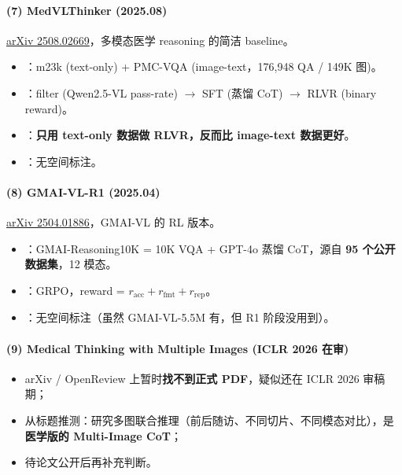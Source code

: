 \paragraph{(7) MedVLThinker (2025.08)}

\href{https://arxiv.org/abs/2508.02669}{arXiv 2508.02669}，多模态医学 reasoning 的简洁 baseline。

\begin{itemize}[leftmargin=1.5em]
  \item {}：m23k (text-only) + PMC-VQA (image-text，176,948 QA / 149K 图)。
  \item {}：filter (Qwen2.5-VL pass-rate) $\to$ SFT (蒸馏 CoT) $\to$ RLVR (binary reward)。
  \item {}：\textbf{只用 text-only 数据做 RLVR，反而比 image-text 数据更好}。
  \item {}：无空间标注。
\end{itemize}

\paragraph{(8) GMAI-VL-R1 (2025.04)}

\href{https://arxiv.org/abs/2504.01886}{arXiv 2504.01886}，GMAI-VL 的 RL 版本。

\begin{itemize}[leftmargin=1.5em]
  \item {}：GMAI-Reasoning10K = 10K VQA + GPT-4o 蒸馏 CoT，源自 \textbf{95 个公开数据集}，12 模态。
  \item {}：GRPO，reward = $r_\text{acc} + r_\text{fmt} + r_\text{rep}$。
  \item {}：无空间标注（虽然 GMAI-VL-5.5M 有，但 R1 阶段没用到）。
\end{itemize}

\paragraph{(9) Medical Thinking with Multiple Images (ICLR 2026 在审)}

\begin{itemize}[leftmargin=1.5em]
  \item arXiv / OpenReview 上暂时\textbf{找不到正式 PDF}，疑似还在 ICLR 2026 审稿期；
  \item 从标题推测：研究多图联合推理（前后随访、不同切片、不同模态对比），是 \textbf{医学版的 Multi-Image CoT}；
  \item 待论文公开后再补充判断。
\end{itemize}

